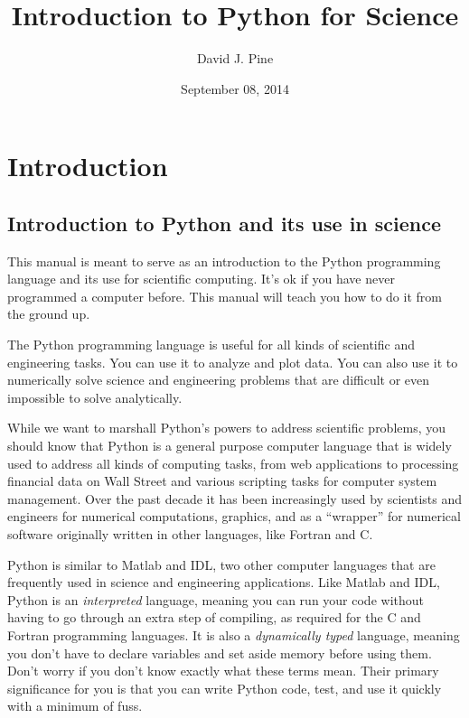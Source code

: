 \documentclass[letterpaper,10pt,english]{sphinxmanual}
\title{Introduction to Python for Science}
\date{September 08, 2014}
\author{David J. Pine}
\begin{document}
\maketitle
\tableofcontents
{}\label{latex-contents::doc}



\chapter{Introduction}
\label{chap1/chap1_intro:introduction-to-python-for-science}\label{chap1/chap1_intro:introduction}\label{chap1/chap1_intro::doc}

\section{Introduction to Python and its use in science}
\label{chap1/chap1_intro:introduction-to-python-and-its-use-in-science}
This manual is meant to serve as an introduction to the Python programming language and its use for scientific computing.  It's ok if you have never programmed a computer before.  This manual will teach you how to do it from the ground up.

The Python programming language is useful for all kinds of scientific and engineering tasks.  You can use it to analyze and plot data.  You can also use it to numerically solve science and engineering problems that are difficult or even impossible to solve analytically.

While we want to marshall Python's powers to address scientific problems, you should know that Python is a general purpose computer language that is widely used to address all kinds of computing tasks, from web applications to processing financial data on Wall Street and various scripting tasks for computer system management.  Over the past decade it has been increasingly used by scientists and engineers for numerical computations, graphics, and as a ``wrapper'' for numerical software originally written in other languages, like Fortran and C.

Python is similar to Matlab and IDL, two other computer languages that are frequently used in science and engineering applications.  Like Matlab and IDL, Python is an \emph{interpreted} language, meaning you can run your code without having to go through an extra step of compiling, as required for the C and Fortran programming languages.  It is also a \emph{dynamically typed} language, meaning you don't have to declare variables and set aside memory before using them. Don't worry if you don't know exactly what these terms mean. Their primary significance for you is that you can write Python code, test, and use it quickly with a minimum of fuss.
\end{document}
